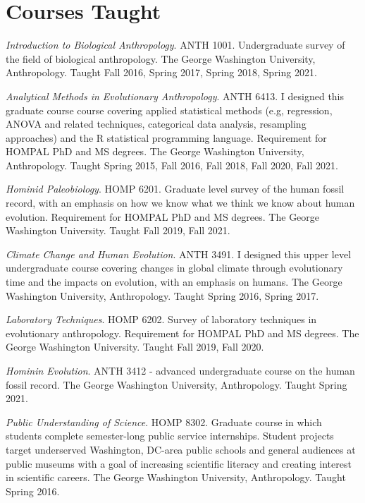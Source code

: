 \documentclass{article}
\newenvironment{mylist}
{\begin{description}[style=unboxed,leftmargin=1.3cm]}
{\end{description}}
\begin{document}
\section*{Courses Taught}
\begin{mylist}

\item[]\emph{Introduction to Biological Anthropology}. ANTH 1001. Undergraduate survey of the field of biological anthropology. The George Washington University, Anthropology. Taught Fall 2016, Spring 2017, Spring 2018, Spring 2021.

\item[] \emph{Analytical Methods in Evolutionary Anthropology}. ANTH 6413. I designed this graduate course course covering applied statistical methods (e.g, regression, ANOVA and related techniques, categorical data analysis, resampling approaches) and the R statistical programming language. Requirement for HOMPAL PhD and MS degrees. The George Washington University, Anthropology. Taught Spring 2015, Fall 2016, Fall 2018, Fall 2020, Fall 2021.

\item[] \emph{Hominid Paleobiology}. HOMP 6201. Graduate level survey of the human fossil record, with an emphasis on how we know what we think we know about human evolution. Requirement for HOMPAL PhD and MS degrees.    The George Washington University. Taught Fall 2019, Fall 2021. 

\item[] \emph{Climate Change and Human Evolution}. ANTH 3491. I designed this upper level undergraduate course covering changes in global climate through evolutionary time and the impacts on evolution, with an emphasis on humans. The George Washington University, Anthropology. Taught Spring 2016, Spring 2017.

\item[] \emph{Laboratory Techniques}. HOMP 6202. Survey of laboratory techniques in evolutionary anthropology. Requirement for HOMPAL PhD and MS degrees. The George Washington University. Taught Fall 2019, Fall 2020. 

\item[] \emph{Hominin Evolution}. ANTH 3412 - advanced undergraduate course on the human fossil record. The George Washington University, Anthropology. Taught Spring 2021.

\item[] \emph{Public Understanding of Science}. HOMP 8302.  Graduate course in which students complete semester-long public service internships. Student projects target underserved Washington, DC-area public schools and general audiences at public museums with a goal of increasing scientific literacy and creating interest in scientific careers. The George Washington University, Anthropology. Taught Spring 2016.


\end{mylist}
\end{document}
